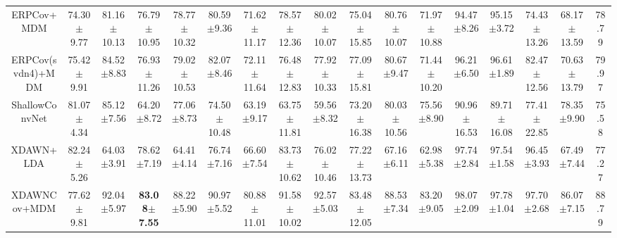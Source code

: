 \begin{adjustbox}{scale=.7}
\begin{tabular}{c|ccccccccccccccc|c}
    \rowcolor{YellowOrange!20} ERPCov+MDM &                   74.30$\pm$9.77 &                  81.16$\pm$10.13 &                  76.79$\pm$10.95 &                  78.77$\pm$10.32 &                   80.59$\pm$9.36 &                  71.62$\pm$11.17 &                  78.57$\pm$12.36 &                  80.02$\pm$10.07 &                   75.04$\pm$15.85 &                  80.76$\pm$10.07 &                  71.97$\pm$10.88 &                   94.47$\pm$8.26 &                   95.15$\pm$3.72 &                  74.43$\pm$13.26 &                  68.17$\pm$13.59 &          78.79 \\
    \rowcolor{YellowOrange!10} ERPCov(svdn4)+MDM &                   75.42$\pm$9.91 &                   84.52$\pm$8.83 &                  76.93$\pm$11.26 &                  79.02$\pm$10.53 &                   82.07$\pm$8.46 &                  72.11$\pm$11.64 &                  76.48$\pm$12.83 &                  77.92$\pm$10.33 &                   77.09$\pm$15.81 &                   80.67$\pm$9.47 &                  71.44$\pm$10.20 &                   96.21$\pm$6.50 &                   96.61$\pm$1.89 &                  82.47$\pm$12.56 &                  70.63$\pm$13.79 &          79.97 \\
    \rowcolor{YellowOrange!20} ShallowConvNet &                   81.07$\pm$4.34 &                   85.12$\pm$7.56 &                   64.20$\pm$8.72 &                   77.06$\pm$8.73 &                  74.50$\pm$10.48 &                   63.19$\pm$9.17 &                  63.75$\pm$11.81 &                   59.56$\pm$8.32 &                   73.20$\pm$16.38 &                  80.03$\pm$10.56 &                   75.56$\pm$8.90 &                  90.96$\pm$16.53 &                  89.71$\pm$16.08 &                  77.41$\pm$22.85 &                   78.35$\pm$9.90 &          75.58 \\
    \rowcolor{YellowOrange!10} XDAWN+LDA &                   82.24$\pm$5.26 &                   64.03$\pm$3.91 &                   78.62$\pm$7.19 &                   64.41$\pm$4.14 &                   76.74$\pm$7.16 &                   66.60$\pm$7.54 &                  83.73$\pm$10.62 &                  76.02$\pm$10.46 &                   77.22$\pm$13.73 &                   67.16$\pm$6.11 &                   62.98$\pm$5.38 &                   97.74$\pm$2.84 &                   97.54$\pm$1.58 &                   96.45$\pm$3.93 &                   67.49$\pm$7.44 &          77.27 \\
    \rowcolor{YellowOrange!20} XDAWNCov+MDM &                   77.62$\pm$9.81 &                   92.04$\pm$5.97 & \textbf{83.08}$\pm$\textbf{7.55} &                   88.22$\pm$5.90 &                   90.97$\pm$5.52 &                  80.88$\pm$11.01 &                  91.58$\pm$10.02 &                   92.57$\pm$5.03 &                   83.48$\pm$12.05 &                   88.53$\pm$7.34 &                   83.20$\pm$9.05 &                   98.07$\pm$2.09 &                   97.78$\pm$1.04 &                   97.70$\pm$2.68 &                   86.07$\pm$7.15 &          88.79 \\

\end{tabular}
\end{adjustbox}
